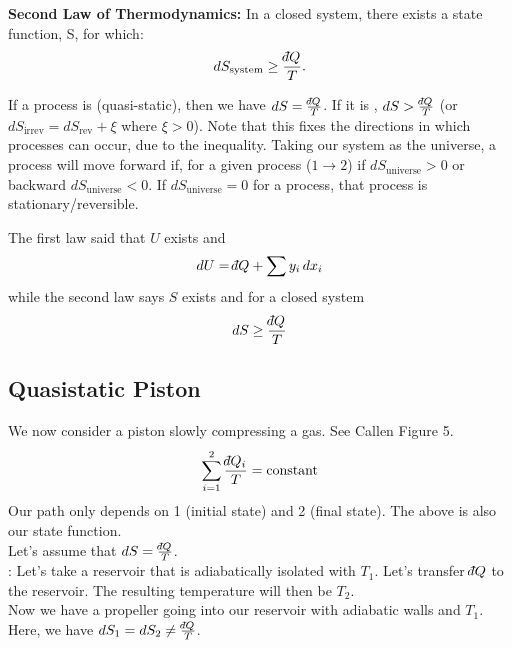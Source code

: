 \documentclass[12pt]{article}
\def\dbar{{\mathchar'26\mkern-12mu d}}
\begin{document}
\textbf{Second Law of Thermodynamics:}  In a closed system, there exists a state function, S, for which:
\begin{equation}
dS_\text{system} \geq \frac{\dbar Q}{T}.
\end{equation}

If a process is  (quasi-static), then we have $dS = \frac{\dbar Q}{T}$.  If it is , $dS > \frac{\dbar Q}{T}$ (or $dS_\text{irrev}=dS_\text{rev} + \xi$ where $\xi >0$). Note that this fixes the directions in which processes can occur, due to the inequality. Taking our system as the universe, a process will move forward if, for a given process ($1\rightarrow 2$) if $dS_\text{universe} > 0$ or backward $dS_\text{universe} < 0$. If $dS_\text{universe} = 0$ for a process, that process is stationary/reversible.

The first law said that $U$ exists and
\begin{equation}
dU = \dbar Q + \sum y_i \, dx_i
\end{equation}
while the second law says $S$ exists and for a closed system
\begin{equation}
dS \geq \frac{\dbar Q}{T}
\end{equation}



\subsection{Quasistatic Piston}
We now consider a piston slowly compressing a gas. See Callen Figure 5.
\begin{equation}
\sum_{i=1}^2 \frac{\dbar Q_i}{T} = \text{constant}
\end{equation}
Our path only depends on 1 (initial state) and 2 (final state).  The above is also our state function.\\

Let's assume that $dS = \frac{\dbar Q}{T}$.\\
: Let's take a reservoir that is adiabatically isolated with $T_1$.  Let's transfer $\dbar Q$ to the reservoir.  The resulting temperature will then be $T_2$.\\
 Now we have a propeller going into our reservoir with adiabatic walls and $T_1$.  Here, we have $dS_1 = dS_2 \neq \frac{\dbar Q}{T}$.\\
\end{document}
